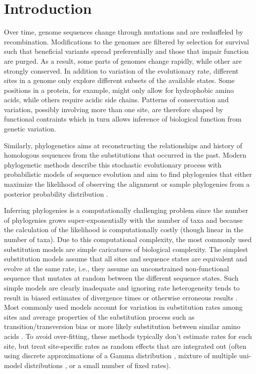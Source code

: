 \documentclass[aps,rmp,twocolumn]{revtex4}
\begin{document}
\section*{Introduction}
Over time, genome sequences change through mutations and are reshuffeled by recombination.
Modifications to the genomes are filtered by selection for survival such that beneficial variants spread preferentially and those that impair function are purged.
As a result, some parts of genomes change rapidly, while other are strongly conserved.
In addition to variation of the evolutionary rate, different sites in a genome only explore different subsets of the available states.
Some positions in a protein, for example, might only allow for hydrophobic amino acids, while others require acidic side chains.
Patterns of conservation and variation, possibly involving more than one site, are therefore shaped by functional contraints which in turn allows inference of biological function from genetic variation.

Similarly, phylogenetics aims at reconstructing the relationships and history of homologous sequences from the substitutions that occurred in the past.
Modern phylogenetic methods describe this stochastic evolutionary process with probabilistic models of sequence evolution and aim to find phylogenies that either maximize the likelihood of observing the alignment or sample phylogenies from a posterior probability distribution \citep{felsenstein2004inferring}.

Inferring phylogenies is a computationally challenging problem since the number of phylogenies grows super-exponentially with the number of taxa and because the calculation of the likelihood is computationally costly (though linear in the number of taxa).
Due to this computational complexity, the most commonly used substitution models are simple caricatures of biological complexity.
The simplest substitution models assume that all sites and sequence states are equivalent and evolve at the same rate, i.e., they assume an unconstrained non-functional sequence that mutates at random between the different sequence states.
Such simple models are clearly inadequate and ignoring rate heterogeneity tends to result in biased estimates of divergence times or otherwise erroneous results \citep{yang1996among}.
Most commonly used models account for variation in substitution rates among sites and average properties of the substitution process such as transition/transversion bias or more likely substitution between similar amino acids \citep{yang_maximum_1994,FastTree2,nguyen_iq-tree:_2015,stamatakis_raxml_2014}.
To avoid over-fitting, these methods typically don't estimate rates for each site, but treat site-specific rates as random effects that are integrated out (often using discrete approximations of a Gamma distribution \citep{yang1996among}, mixture of multiple uni-model distributions \citep{mayrose2005gamma}, or a small number of fixed rates).
\end{document}
